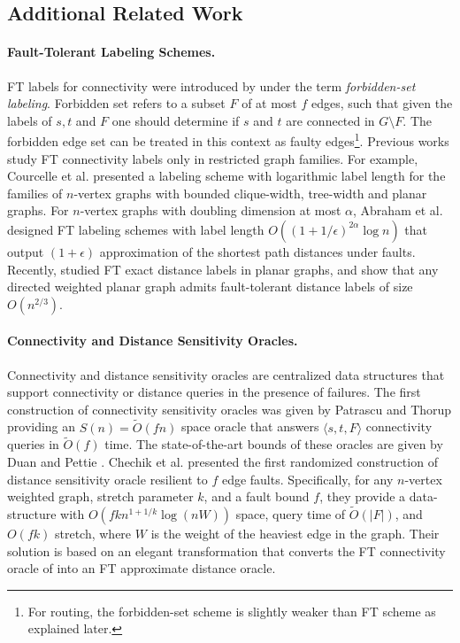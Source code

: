 \subsection{Additional Related Work}

\paragraph{Fault-Tolerant Labeling Schemes.} FT labels for connectivity were introduced by \cite{courcelle2007forbidden} under the term \emph{forbidden-set labeling}. Forbidden set refers to a subset $F$ of at most $f$ edges, such that given the labels of $s,t$ and $F$ one should determine if $s$ and $t$ are connected in $G \setminus F$. The forbidden edge set can be treated in this context as faulty edges\footnote{For routing, the forbidden-set scheme is slightly weaker than FT scheme as explained later.}.
Previous works study FT connectivity labels only in restricted graph families. For example, Courcelle et al. \cite{CourcelleT07} presented a labeling scheme with logarithmic label length for the families of $n$-vertex graphs with bounded clique-width, tree-width and planar graphs. For $n$-vertex graphs with doubling dimension at most $\alpha$, Abraham et al. \cite{AbrahamCGP16} designed FT labeling schemes with label length $O((1 + 1/\epsilon)^{2\alpha}\log n)$ that output $(1+\epsilon)$ approximation of the shortest path distances under faults. Recently, \cite{DBLP:journals/corr/abs-2102-07154} studied FT exact distance labels in planar graphs, and show that any directed weighted planar graph admits fault-tolerant distance labels of size $O(n^{2/3})$.

\paragraph{Connectivity and Distance Sensitivity Oracles.} 
Connectivity and distance sensitivity oracles are centralized data structures that support connectivity or distance queries in the presence of failures. 
The first construction of connectivity sensitivity oracles was given by Patrascu and Thorup \cite{patrascu2007planning} providing an $S(n)=\widetilde{O}(fn)$ space oracle that answers $\langle s,t, F \rangle$ connectivity queries in $\widetilde{O}(f)$ time. The state-of-the-art bounds of these oracles are given by Duan and Pettie \cite{DuanConnectivitySODA17}.
Chechik et al. \cite{chechik2012f} presented the first randomized construction of distance sensitivity oracle resilient to $f$ edge faults. 
Specifically, for any $n$-vertex weighted graph, stretch parameter $k$, and a fault bound $f$, they provide a data-structure with $O(f k n^{1+1/k}\log(nW))$ space, query time of $\widetilde{O}(|F|)$, and $O(f k)$ stretch, where $W$ is the weight of the heaviest edge in the graph. Their solution is based on an elegant transformation that converts the FT connectivity oracle of \cite{patrascu2007planning} into an FT approximate distance oracle.

